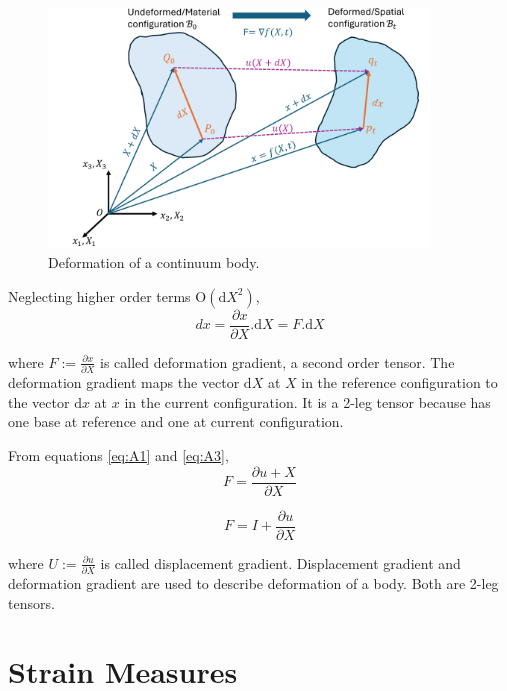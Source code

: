\begin{figure}[H]
    \centering
    \includegraphics[width=0.9\textwidth]{images/Continuum_Mechanics_configurations.pdf}
    \caption{Deformation of a continuum body.}
    \label{Continuum_body_deformation}
\end{figure}

Neglecting higher order terms $\textrm{O} (\textrm{d}X^2)$,
\begin{equation}
\label{eq:A3}
    dx = \frac{\partial x}{\partial X}.\textrm{d}X = F.\textrm{d}X
\end{equation}

where $F:=\frac{\partial x}{\partial X}$ is called deformation gradient, a second order tensor. The deformation gradient maps the vector $\textrm{d}X$ at $X$ in the reference configuration to the vector $\textrm{d}x$ at $x$ in the current configuration. It is a 2-leg tensor because has one base at reference and one at current configuration.

From equations \ref{eq:A1} and \ref{eq:A3},
\begin{equation}
\label{eq:A4}
    F = \frac{\partial u + X}{\partial X}
\end{equation}

\begin{equation}
\label{eq:A5}
    F = I + \frac{\partial u}{\partial X}
\end{equation}

where $U:=\frac{\partial u}{\partial X}$ is called displacement gradient. Displacement gradient and deformation gradient are used to describe deformation of a body. Both are 2-leg tensors.

\section{Strain Measures}

